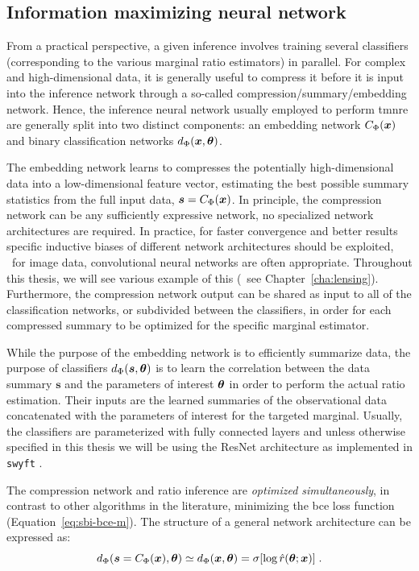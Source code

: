 \subsection{Information maximizing neural network} \label{subsec:tmnre-nn}

From a practical perspective, a given inference involves training several classifiers (corresponding to the various marginal ratio estimators) in parallel. For complex and high-dimensional data, it is generally useful to compress it before it is input into the inference network through a so-called compression/summary/embedding network. Hence, the inference neural network usually employed to perform \gls*{tmnre} are generally split into two distinct components: an embedding network $C_\Phi(\bm{x})$ and binary classification networks $d_\Phi(\bm{x}, \bm{\theta})$. 

The embedding network learns to compresses the potentially high-dimensional data into a low-dimensional feature vector, estimating the best possible summary statistics from the full input data, $\boldsymbol{s}= C_\Phi(\bm{x})$. In principle, the compression network can be any sufficiently expressive network, no specialized network architectures are required. In practice, for faster convergence and better results specific inductive biases of different network architectures should be exploited, \eg~for image data, convolutional neural networks are often appropriate. Throughout this thesis, we will see various example of this (\eg~see Chapter~\ref{cha:lensing}). Furthermore, the compression network output can be shared as input to all of the classification networks, or subdivided between the classifiers, in order for each compressed summary to be optimized for the specific marginal estimator. 

While the purpose of the embedding network is to efficiently summarize data, the purpose of classifiers $d_\Phi(\boldsymbol{s}, \bm{\theta})$ is to learn the correlation between the data summary $\boldsymbol{s}$ and the parameters of interest $\bm{\theta}$ in order to perform the actual ratio estimation. Their inputs are the learned summaries of the observational data concatenated with the parameters of interest for the targeted marginal. Usually, the classifiers are parameterized with fully connected layers and unless otherwise specified in this thesis we will be using the ResNet \cite{he2016deep} architecture as implemented in \texttt{swyft} \cite{Miller2022}.

The compression network and ratio inference are \emph{optimized simultaneously}, in contrast to other algorithms in the literature, minimizing the \gls*{bce} loss function (Equation~\eqref{eq:sbi-bce-m}). The structure of a general network architecture can be expressed as:
\begin{equation}\label{eq:nn-c}
    d_\Phi(\boldsymbol{s}= C_\Phi(\bm{x}), \bm{\theta}) \simeq  d_\Phi(\bm{x}, \bm{\theta})  = \sigma[ \log \hat{r}(\bm{\theta}; \bm{x})] \;.
\end{equation}

